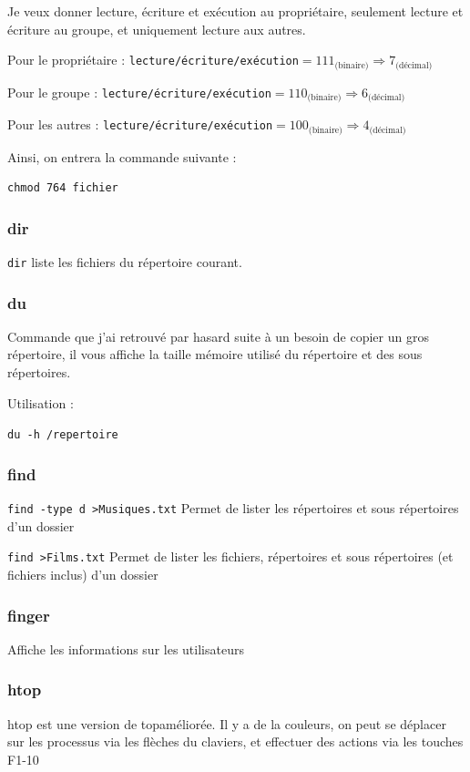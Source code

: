 \documentclass[a4paper,twoside]{article}
\begin{document}
Je veux donner lecture, écriture et exécution au propriétaire, seulement lecture et écriture au groupe, et uniquement lecture aux autres.

Pour le propriétaire : \texttt{lecture/écriture/exécution}$=111_{\text{(binaire)}}\Rightarrow 7_{\text{(décimal)}}$

Pour le groupe : \texttt{lecture/écriture/exécution}$=110_{\text{(binaire)}}\Rightarrow 6_{\text{(décimal)}}$

Pour les autres : \texttt{lecture/écriture/exécution}$=100_{\text{(binaire)}}\Rightarrow 4_{\text{(décimal)}}$


Ainsi, on entrera la commande suivante :

\begin{verbatim}
chmod 764 fichier
\end{verbatim}

\subsubsection{dir}
\verb|dir| liste les fichiers du répertoire courant.

\subsubsection{du}
Commande que j'ai retrouvé par hasard suite à un besoin de copier un gros répertoire, il vous affiche la taille mémoire utilisé du répertoire et des sous répertoires.

Utilisation :

\verb|du -h /repertoire|

\subsubsection{find}
\verb|find -type d >Musiques.txt|
Permet de lister les répertoires et sous répertoires d'un dossier

\verb|find >Films.txt|
Permet de lister les fichiers, répertoires et sous répertoires (et fichiers inclus) d'un dossier

\subsubsection{finger}
Affiche les informations sur les utilisateurs

\subsubsection{htop}\label{sec:htop}
htop est une version de \og top\fg améliorée. Il y a de la couleurs, on peut se déplacer sur les processus via les flèches du claviers, et effectuer des actions via les touches \og F1-10\fg
\end{document}

